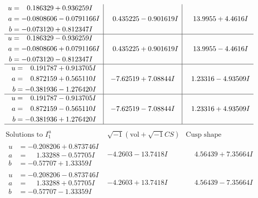 \documentclass[1p]{elsarticle_modified}
\theoremstyle{definition}
\newcommand{\I}{\sqrt{-1}}
\begin{document}
$$\begin{array}{c|c|c}
\begin{aligned}
u &= \phantom{-}0.186329 + 0.936259 I \\
a &= -0.0808606 - 0.0791166 I \\
b &= -0.073120 + 0.812347 I\end{aligned}
 & \phantom{-}0.435225 - 0.901619 I & \phantom{-}13.9955 + 4.4616 I \\ \hline\begin{aligned}
u &= \phantom{-}0.186329 - 0.936259 I \\
a &= -0.0808606 + 0.0791166 I \\
b &= -0.073120 - 0.812347 I\end{aligned}
 & \phantom{-}0.435225 + 0.901619 I & \phantom{-}13.9955 - 4.4616 I \\ \hline\begin{aligned}
u &= \phantom{-}0.191787 + 0.913705 I \\
a &= \phantom{-}0.872159 + 0.565110 I \\
b &= -0.381936 - 1.276420 I\end{aligned}
 & -7.62519 + 7.08844 I & \phantom{-}1.23316 - 4.93509 I \\ \hline\begin{aligned}
u &= \phantom{-}0.191787 - 0.913705 I \\
a &= \phantom{-}0.872159 - 0.565110 I \\
b &= -0.381936 + 1.276420 I\end{aligned}
 & -7.62519 - 7.08844 I & \phantom{-}1.23316 + 4.93509 I\\
 \hline 
 \end{array}$$\newpage$$\begin{array}{c|c|c}  
\text{Solutions to }I^u_{1}& \I (\text{vol} + \sqrt{-1}CS) & \text{Cusp shape}\\
 \hline 
\begin{aligned}
u &= -0.208206 + 0.873746 I \\
a &= \phantom{-}1.33288 - 0.57705 I \\
b &= -0.57707 + 1.33359 I\end{aligned}
 & -4.2603 - 13.7418 I & \phantom{-}4.56439 + 7.35664 I \\ \hline\begin{aligned}
u &= -0.208206 - 0.873746 I \\
a &= \phantom{-}1.33288 + 0.57705 I \\
b &= -0.57707 - 1.33359 I\end{aligned}
 & -4.2603 + 13.7418 I & \phantom{-}4.56439 - 7.35664 I \\ \hline\begin{aligned}

\end{aligned}
\end{array}$$
\end{document}
